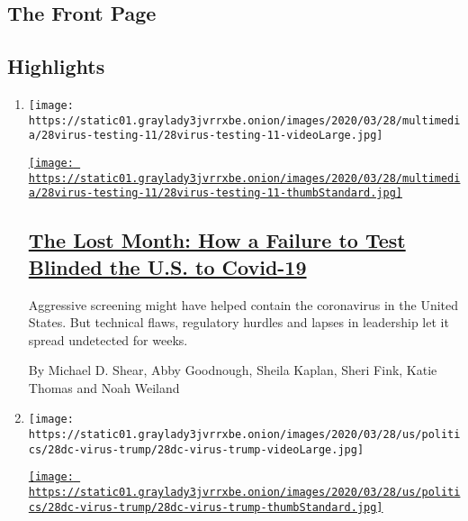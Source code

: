 \hypertarget{the-front-page}{%
\subsection{The Front Page}\label{the-front-page}}

\hypertarget{highlights}{%
\subsection{Highlights}\label{highlights}}

\begin{enumerate}
\def\labelenumi{\arabic{enumi}.}
\item
  \texttt{[image: https://static01.graylady3jvrrxbe.onion/images/2020/03/28/multimedia/28virus-testing-11/28virus-testing-11-videoLarge.jpg]}

  \href{/2020/03/28/us/testing-coronavirus-pandemic.html}{\texttt{[image: https://static01.graylady3jvrrxbe.onion/images/2020/03/28/multimedia/28virus-testing-11/28virus-testing-11-thumbStandard.jpg]}}

  \hypertarget{the-lost-month-how-a-failure-to-test-blinded-the-us-to-covid-19}{%
  \subsection{\texorpdfstring{\href{/2020/03/28/us/testing-coronavirus-pandemic.html}{The
  Lost Month: How a Failure to Test Blinded the U.S. to
  Covid-19}}{The Lost Month: How a Failure to Test Blinded the U.S. to Covid-19}}\label{the-lost-month-how-a-failure-to-test-blinded-the-us-to-covid-19}}

  Aggressive screening might have helped contain the coronavirus in the
  United States. But technical flaws, regulatory hurdles and lapses in
  leadership let it spread undetected for weeks.

  By Michael D. Shear, Abby Goodnough, Sheila Kaplan, Sheri Fink, Katie
  Thomas and Noah Weiland
\item
  \texttt{[image: https://static01.graylady3jvrrxbe.onion/images/2020/03/28/us/politics/28dc-virus-trump/28dc-virus-trump-videoLarge.jpg]}

  \href{/2020/03/28/us/politics/trump-virginia-comfort-coronavirus.html}{\texttt{[image: https://static01.graylady3jvrrxbe.onion/images/2020/03/28/us/politics/28dc-virus-trump/28dc-virus-trump-thumbStandard.jpg]}}

  \hypertarget{trump-to-issue-travel-advisory-for-ny-region-backing-off-quarantine-threat}{%
}
\end{enumerate}
